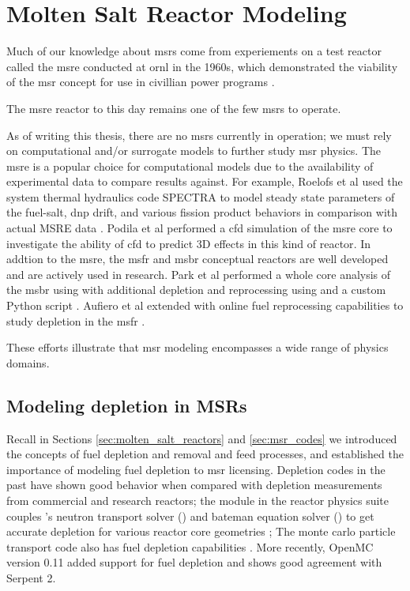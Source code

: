 \chapter{Molten Salt Reactor Modeling}%
Much of our knowledge about \Gls{msr}s come from experiements on a test reactor
called the \Gls{msre} conducted at \Gls{ornl} in the 1960s, which demonstrated
the viability of the \Gls{msr} concept for use in civillian power programs
\cite{haubenreich_experience_1970} \cite{rosenthal_molten-salt_1970}.

The \Gls{msre} reactor to this day remains one of the few \Gls{msr}s to operate.

As of writing this thesis, there are no \Gls{msr}s currently in operation; we
must rely on computational and/or surrogate models to further study \Gls{msr}
physics. The \Gls{msre} is a popular choice for computational models due to the
availability of experimental data to compare results against. For example,
Roelofs et al used the system thermal hydraulics code SPECTRA to model steady
state parameters of the fuel-salt, \Gls{dnp} drift, and various fission product
behaviors in comparison with actual MSRE data \cite{roelofs_molten_2021}.
Podila et al performed a \Gls{cfd} simulation of the \Gls{msre} core to
investigate the ability of \Gls{cfd} to predict 3D effects in this kind of
reactor\cite{podila_cfd_2019}. 
In addtion to the \Gls{msre}, the \Gls{msfr}\cite{merle-lucotte_launching_2011}
and \Gls{msbr}\cite{robertson_conceptual_1971} conceptual reactors are well
developed and are actively used in research. Park et al performed a whole core
analysis of the \Gls{msbr} using \MCNPSIX with additional depletion and
reprocessing using \CINDERNINETY and a custom Python script \cite{park_whole_2015}.
Aufiero et al extended \SerpentTWO with online fuel reprocessing capabilities to
study depletion in the \Gls{msfr} \cite{aufiero_extended_2013}.

These efforts illustrate that \Gls{msr} modeling encompasses a wide range of
physics domains.

\section{Modeling depletion in MSRs} Recall in Sections
\ref{sec:molten_salt_reactors} and \ref{sec:msr_codes} we introduced the
concepts of fuel depletion and removal and feed processes, and established the
importance of modeling fuel depletion to \Gls{msr} licensing. Depletion codes in
the past have shown good behavior when compared with depletion measurements from
commercial and research reactors; the \TRITON module in the \SCALE reactor physics
suite couples \SCALE's neutron transport solver (\Shift) and bateman equation
solver (\ORIGEN) to get accurate depletion for various reactor core geometries
\cite{dehart_reactor_2011}; The \SerpentTWO monte carlo particle transport code
also has fuel depletion capabilities \cite{leppanen_burnup_2009}. More recently,
OpenMC version 0.11 added support for fuel depletion and shows good agreement
with Serpent 2\cite{romano_depletion_2021}. 

